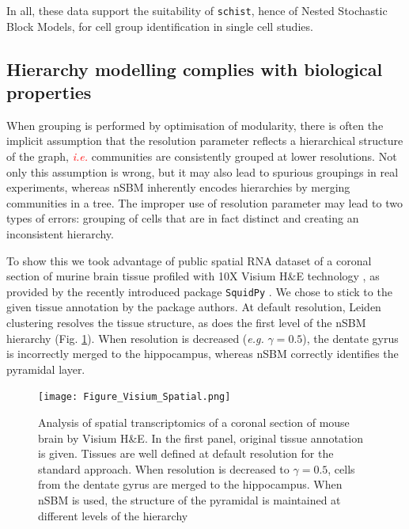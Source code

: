 \documentclass[10pt]{article}
\begin{document}
In all, these data support the suitability of \texttt{schist}, hence of Nested Stochastic Block Models, for cell group identification in single cell studies. 

\subsection*{Hierarchy modelling complies with biological properties}

When grouping is performed by optimisation of modularity, there is often the implicit assumption that the resolution parameter reflects a hierarchical structure of the graph, \textcolor{red}{\emph{i.e.}} communities are consistently grouped at lower resolutions. Not only this assumption is wrong, but it may also lead to spurious groupings in real experiments, whereas nSBM inherently encodes hierarchies by merging communities in a tree. The improper use of resolution parameter may lead to two types of errors: grouping of cells that are in fact distinct and creating an inconsistent hierarchy. 

To show this we took advantage of public spatial RNA dataset of a coronal section of murine brain tissue profiled with 10X Visium H\&E technology \cite{Gracia_Villacampa_2020}, as provided by the recently introduced package \texttt{SquidPy} \cite{Palla_Theis_2021}. We chose to stick to the given tissue annotation by the package authors. At default resolution, Leiden clustering resolves the tissue structure, as does the first level of the nSBM hierarchy (Fig. \ref{Figure_Visium}). When resolution is decreased (\emph{e.g.} $\gamma = 0.5$), the dentate gyrus is incorrectly merged to the hippocampus, whereas nSBM correctly identifies the pyramidal layer. 

\begin{figure}[H]
\centering
\texttt{[image: Figure\_Visium\_Spatial.png]}
\caption[]{Analysis of spatial transcriptomics of a coronal section of mouse brain by Visium H\&E. In the first panel, original tissue annotation is given. Tissues are well defined at default resolution for the standard approach. When resolution is decreased to $\gamma = 0.5$, cells from the dentate gyrus are merged to the hippocampus. When nSBM is used, the structure of the pyramidal is maintained at different levels of the hierarchy}\label{Figure_Visium}
\end{figure}
\end{document}
